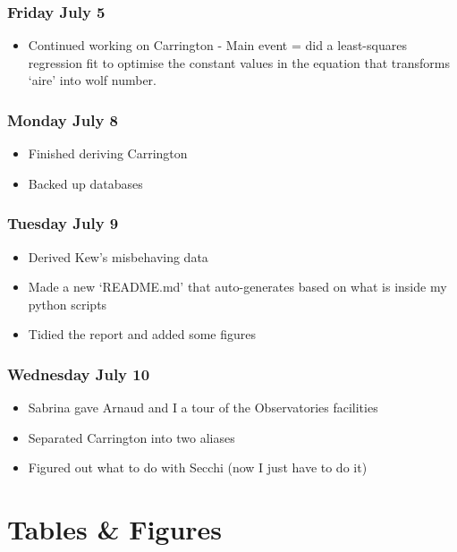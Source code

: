 \documentclass[12pt]{article}
\begin{document}
\subsubsection{Friday July 5}
\begin{itemize}
    \item Continued working on Carrington - Main event = did a least-squares regression fit to optimise the constant values in the equation that transforms `aire' into wolf number.
\end{itemize}

\subsubsection{Monday July 8}
\begin{itemize}
    \item Finished deriving Carrington
    \item Backed up databases
\end{itemize}

\subsubsection{Tuesday July 9}
\begin{itemize}
    \item Derived Kew's misbehaving data
    \item Made a new `README.md' that auto-generates based on what is inside my python scripts
    \item Tidied the report and added some figures
\end{itemize}

\subsubsection{Wednesday July 10}
\begin{itemize}
    \item Sabrina gave Arnaud and I a tour of the Observatories facilities
    \item Separated Carrington into two aliases
    \item Figured out what to do with Secchi (now I just have to do it)
\end{itemize}



\section{Tables & Figures}
\end{document}
